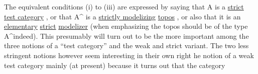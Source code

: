 The equivalent conditions (i) to (iii) are expressed by saying that
A is a \uline{strict test category} , or that  A\^{} is a \uline{strictly modelizing}
\uline{topos} , or also that it is an \uline{elementary} \uline{strict} \uline{modelizer} (when
emphasizing the topos  should be of the type A\^{}\hand{\unsure{/}}indeed). This presumably
will turn out to be the more important among the three notions\hand{,} of a 
``test category'' and the weak and strict variant. The two less stringent
notions however seem interesting in their own right he notion of a weak
test category mainly (at present) because it turns out that the category
